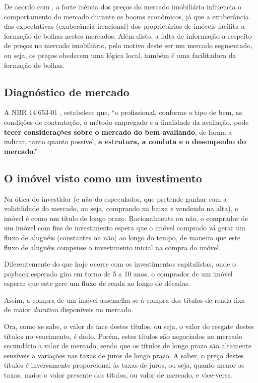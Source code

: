 \documentclass[
	12pt,				%
	oneside,			%
	a4paper,			%
	chapter=TITLE,		%
	section=TITLE,		%
	english,			%
	brazil				%
	]{abntex2}
\begin{document}
De acordo com \textcites{ADAMS201038}[3]{ADAMS201038}, a forte inércia
dos preços do mercado imobiliário influencia o comportamento do mercado
durante os booms econômicos, já que a exuberância das expectativas
(exuberância irracional) dos proprietários de imóveis facilita a
formação de bolhas nestes mercados. Além disto, a falta de informação a
respeito de preços no mercado imobiliário, pelo motivo deste ser um
mercado segmentado, ou seja, os preços obedecem uma lógica local, também
é uma facilitadora da formação de bolhas.

\subsection{Diagnóstico de mercado}\label{diagnuxf3stico-de-mercado}

A NBR 14.653-01 \autocite*[12]{NBR1465301}, estabelece que, ``o
profissional, conforme o tipo de bem, as condições de contratação, o
método empregado e a finalidade da avaliação, pode \textbf{tecer
considerações sobre o mercado do bem avaliando}, de forma a indicar,
tanto quanto possível, \textbf{a estrutura, a conduta e o desempenho do
mercado}.''

\subsection{O imóvel visto como um
investimento}\label{o-imuxf3vel-visto-como-um-investimento}

Na ótica do investidor (e não do especulador, que pretende ganhar com a
volatilidade do mercado, ou seja, comprando na baixa e vendendo na
alta), o imóvel é como um título de longo prazo. Racionalmente ou não, o
comprador de um imóvel com fins de investimento espera que o imóvel
comprado vá gerar um fluxo de aluguéis (constantes ou não) ao longo do
tempo, de maneira que este fluxo de aluguéis compense o investimento
inicial na compra do imóvel.

Diferentemente do que hoje ocorre com os investimentos capitalistas,
onde o payback esperado gira em torno de 5 a 10 anos, o comprador de um
imóvel esperar que este gere um fluxo de renda ao longo de décadas.

Assim, a compra de um imóvel assemelha-se à compra dos títulos de renda
fixa de maior \emph{duration} disponíveis no mercado.

Ora, como se sabe, o valor de face destes títulos, ou seja, o valor do
resgate destes títulos no vencimento, é dado. Porém, estes títulos são
negociados no mercado secundário a valor de mercado, sendo que os
títulos de longo prazo são altamente sensíveis a variações nas taxas de
juros de longo prazo. A saber, o preço destes títulos é inversamente
proporcional às taxas de juros, ou seja, quanto menor as taxas, maior o
valor presente dos títulos, ou valor de mercado, e vice-versa.
\end{document}
